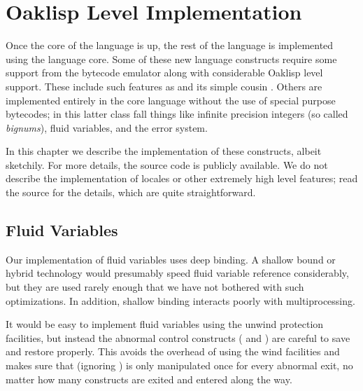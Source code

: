 \chapter{Oaklisp Level Implementation}

Once the core of the language is up, the rest of the language is
implemented using the language core.  Some of these new language
constructs require some support from the bytecode emulator along with
considerable Oaklisp level support.  These include such features as
 and its simple cousin .  Others are implemented
entirely in the core language without the use of special purpose
bytecodes; in this latter class fall things like infinite precision
integers (so called {\em bignums}), fluid variables, and the error
system.

In this chapter we describe the implementation of these constructs,
albeit sketchily.  For more details, the source code is publicly
available.  We do not describe the implementation of locales or other
extremely high level features; read the source for the details, which
are quite straightforward.


\section{Fluid Variables} \label{fluid-impl}

Our implementation of fluid variables uses deep binding.  A shallow
bound or hybrid technology would presumably speed fluid variable
reference considerably, but they are used rarely enough that we have
not bothered with such optimizations.  In addition, shallow binding
interacts poorly with multiprocessing.


It would be easy to implement fluid variables using the unwind
protection facilities, but instead the abnormal control constructs
( and ) are careful to save and restore
 properly.  This avoids the overhead of using
the wind facilities and makes sure that (ignoring )
 is only manipulated once for every abnormal
exit, no matter how many  constructs are exited and entered
along the way.




